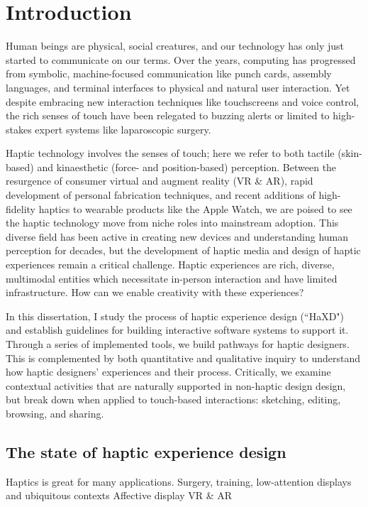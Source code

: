 
\chapter{Introduction}
\label{ch:Introduction}
Human beings are physical, social creatures, and our technology has only just started to communicate on our terms.
Over the years, computing has progressed from symbolic, machine-focused communication like punch cards, assembly languages, and terminal interfaces to physical and natural user interaction.
Yet despite embracing new interaction techniques like touchscreens and voice control, the rich senses of touch have been relegated to buzzing alerts or limited to high-stakes expert systems like laparoscopic surgery.

Haptic technology involves the senses of touch; here we refer to both tactile (skin-based) and kinaesthetic (force- and position-based) perception.
Between the resurgence of consumer virtual and augment reality (VR \& AR), rapid development of personal fabrication techniques, and recent additions of high-fidelity haptics to wearable products like the Apple Watch, we are poised to see the haptic technology move from niche roles into mainstream adoption.
This diverse field has been active in creating new devices and understanding human perception for decades, but the development of haptic media and design of haptic experiences remain a critical challenge.
Haptic experiences are rich, diverse, multimodal entities which necessitate in-person interaction and have limited infrastructure.
How can we enable creativity with these experiences?

In this dissertation, I study the process of haptic experience design (``HaXD") and establish guidelines for building interactive software systems to support it.
Through a series of implemented tools, we build pathways for haptic designers.
This is complemented by both quantitative and qualitative inquiry to understand how haptic designers' experiences and their process.
Critically, we examine contextual activities that are naturally supported in non-haptic design design, but break down when applied to touch-based interactions: sketching, editing, browsing, and sharing.


\section{The state of haptic experience design}
Haptics is great for many applications.
Surgery, training,
low-attention displays and ubiquitous contexts
Affective display
VR \& AR

